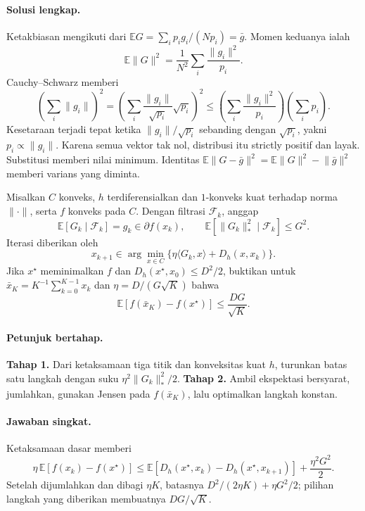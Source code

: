 \paragraph{Solusi lengkap.}
\label{orig03:final:solution:0004}
Ketakbiasan mengikuti dari
$\mathbb E G=\sum_i p_i g_i/(Np_i)=\bar g$. Momen keduanya ialah
\[
 \mathbb E\lVert G\rVert^2
 =\frac1{N^2}\sum_i\frac{\lVert g_i\rVert^2}{p_i}.
\]
Cauchy--Schwarz memberi
\[
 \left(\sum_i\lVert g_i\rVert\right)^2
 =\left(\sum_i\frac{\lVert g_i\rVert}{\sqrt{p_i}}\sqrt{p_i}\right)^2
 \le\left(\sum_i\frac{\lVert g_i\rVert^2}{p_i}\right)
      \left(\sum_i p_i\right).
\]
Kesetaraan terjadi tepat ketika
$\lVert g_i\rVert/\sqrt{p_i}$ sebanding dengan $\sqrt{p_i}$, yakni
$p_i\propto\lVert g_i\rVert$. Karena semua vektor tak nol, distribusi itu
strictly positif dan layak. Substitusi memberi nilai minimum. Identitas
$\mathbb E\lVert G-\bar g\rVert^2=
\mathbb E\lVert G\rVert^2-\lVert\bar g\rVert^2$ memberi varians yang diminta.

\begin{exercise}
\label{orig03:final:exercise:0005}
Misalkan $C$ konveks, $h$ terdiferensialkan dan $1$-konveks kuat terhadap
norma $\lVert\cdot\rVert$, serta $f$ konveks pada $C$. Dengan filtrasi
$\mathcal F_k$, anggap
\[
 \mathbb E[G_k\mid\mathcal F_k]=g_k\in\partial f(x_k),
 \qquad
 \mathbb E[\lVert G_k\rVert_*^2\mid\mathcal F_k]\le G^2.
\]
Iterasi diberikan oleh
\[
 x_{k+1}\in\arg\min_{x\in C}
 \{\eta\langle G_k,x\rangle+D_h(x,x_k)\}.
\]
Jika $x^\star$ meminimalkan $f$ dan
$D_h(x^\star,x_0)\le D^2/2$, buktikan untuk
$\bar x_K=K^{-1}\sum_{k=0}^{K-1}x_k$ dan
$\eta=D/(G\sqrt K)$ bahwa
\[
 \mathbb E[f(\bar x_K)-f(x^\star)]\le\frac{DG}{\sqrt K}.
\]
\end{exercise}

\paragraph{Petunjuk bertahap.}
\label{orig03:final:hint:0005}
\textbf{Tahap 1.} Dari ketaksamaan tiga titik dan konveksitas kuat $h$,
turunkan batas satu langkah dengan suku $\eta^2\lVert G_k\rVert_*^2/2$.
\textbf{Tahap 2.} Ambil ekspektasi bersyarat, jumlahkan, gunakan Jensen pada
$f(\bar x_K)$, lalu optimalkan langkah konstan.

\paragraph{Jawaban singkat.}
\label{orig03:final:answer:0005}
Ketaksamaan dasar memberi
\[
 \eta\,\mathbb E[f(x_k)-f(x^\star)]
 \le\mathbb E[D_h(x^\star,x_k)-D_h(x^\star,x_{k+1})]
 +\frac{\eta^2G^2}{2}.
\]
Setelah dijumlahkan dan dibagi $\eta K$, batasnya
$D^2/(2\eta K)+\eta G^2/2$; pilihan langkah yang diberikan membuatnya
$DG/\sqrt K$.

